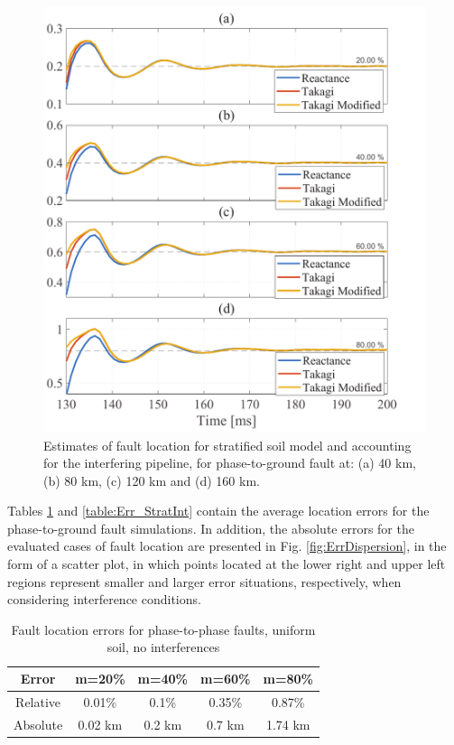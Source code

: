 \documentclass[conference]{IEEEtran}
\begin{document}
	\begin{figure}[!hbt]
		\begin{center}
			\includegraphics[width=1.1\columnwidth]{./fig/FaultInterf2.pdf}
			\caption{Estimates of fault location for stratified soil model and accounting for the interfering pipeline, for phase-to-ground fault at: (a) 40 km, (b) 80 km, (c) 120 km and (d) 160 km.}
			\label{fig:Conv_StratWithInterf}
		\end{center}
	\end{figure}
	
	Tables \ref{table:Err_UnifNoInt} and \ref{table:Err_StratInt} contain the average location errors for the phase-to-ground fault simulations. In addition, the absolute errors for the evaluated cases of fault location are presented in Fig. \ref{fig:ErrDispersion}, in the form of a scatter plot, in which points located at the lower right and upper left regions represent smaller and larger error situations, respectively, when considering interference conditions.
	
	\begin{table}[!hbt]
		\renewcommand{\arraystretch}{1.3}
		\caption{Fault location errors for phase-to-phase faults, uniform soil, no interferences}
		\label{table:Err_UnifNoInt}
		\centering
		\begin{tabular}{|c|c|c|c|c|}
			\hline
			\textbf{Error} & \textbf{m=20\%} & \textbf{m=40\%} & \textbf{m=60\%} & \textbf{m=80\%}\\
			\hline
			Relative & 0.01\% & 0.1\%  & 0.35\%  & 0.87\%\\
			\hline
			Absolute & 0.02 km & 0.2 km & 0.7 km & 1.74 km\\
			\hline
		\end{tabular}
	\end{table}
	
\end{document}
